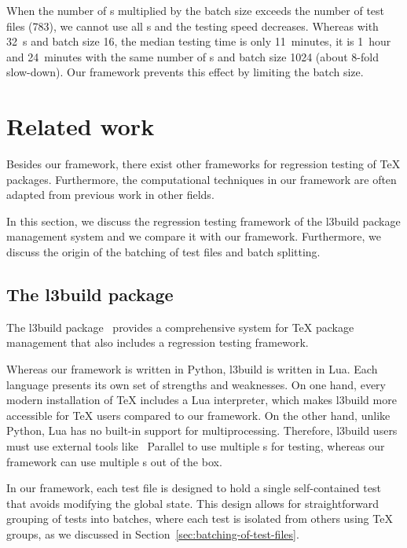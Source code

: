 \documentclass[final]{ltugboat}
\begin{document}
When the number of s multiplied by the batch size exceeds the number of test files (783), we cannot use all s and the testing speed decreases. Whereas with 32~s and batch size 16, the median testing time is only 11~minutes, it is 1~hour and 24~minutes with the same number of s and batch size 1024 (about 8-fold slow-down). Our framework prevents this effect by limiting the batch size.

\section{Related work}
\label{sec:related-work}

Besides our framework, there exist other frameworks for regression testing of \TeX{} packages. Furthermore, the computational techniques in our framework are often adapted from previous work in other fields.

In this section, we discuss the regression testing framework of the l3build package management system and we compare it with our framework. Furthermore, we discuss the origin of the batching of test files and batch splitting.

\subsection{The l3build package}
The l3build package~\cite{mittelbach2014l3build, latex2023l3build, wright2022l3build, wright2015automating} provides a comprehensive system for \TeX{} package management that also includes a regression testing framework.

Whereas our framework is written in Python, l3build is written in Lua. Each language presents its own set of strengths and weaknesses. On one hand, every modern installation of \TeX{} includes a Lua interpreter, which makes l3build more accessible for \TeX{} users compared to our framework. On the other hand, unlike Python, Lua has no built-in support for multiprocessing. Therefore, l3build users must use external tools like ~Parallel to use multiple s for testing, whereas our framework can use multiple s out of the box.

In our framework, each test file is designed to hold a single self-contained test that avoids modifying the global state. This design allows for straightforward grouping of tests into batches, where each test is isolated from others using \TeX{} groups, as we discussed in Section~\ref{sec:batching-of-test-files}.
\end{document}
